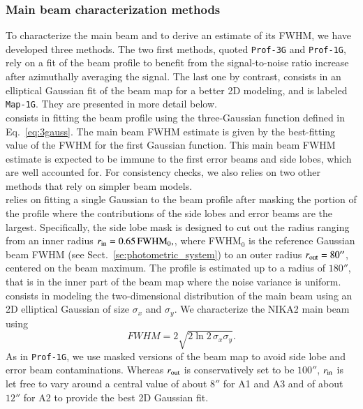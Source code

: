 \subsubsection{Main beam characterization methods}
\label{se:mainbeam_methods}
To characterize the main beam and to derive an estimate of its FWHM, we
have developed three methods. The two first methods, quoted
{\tt Prof-3G} and {\tt Prof-1G}, rely on a fit of the beam profile to
benefit from the signal-to-noise ratio increase after azimuthally
averaging the signal. The last one by contrast,
consists in an elliptical Gaussian fit of the beam map for a better
2D modeling, and is labeled {\tt Map-1G}. They are presented in more
detail below. \\

 consists in fitting the beam profile using the
three-Gaussian function defined in Eq.~\ref{eq:3gauss}.
 The main beam FWHM estimate is given by the best-fitting value
of the FWHM for the first Gaussian function. {\lp This main beam FWHM
estimate is expected to be immune to the first error beams
and side lobes, which are well accounted for. For consistency checks,
we also relies on two other methods that rely on simpler beam models.}\\

 relies on fitting a single Gaussian to the beam
profile after masking the portion of the profile where the
contributions of the side lobes and error beams are the
largest. Specifically, the side lobe mask is designed to cut out {\lp the
radius ranging from an inner radius
$r_{\rm{in}} = 0.65\, \mathrm{FWHM}_0,$, where FWHM$_0$ is the
reference Gaussian beam FWHM (see Sect.~\ref{se:photometric_system})
to an outer radius $r_{\rm{out}} = 80''$,} centered on the beam
maximum.
The profile is estimated up to a radius of
$180''$, that is in the inner part of the beam map where the noise
variance is uniform.\\

 consists in modeling the two-dimensional distribution of
the main beam using an 2D elliptical Gaussian of size $\sigma_x$ and
$\sigma_y$. We characterize the NIKA2 main beam using
\begin{equation}
  FWHM = 2 \sqrt{2\ln {2}\, \sigma_x\sigma_y}.
  \label{eq:fwhm_geom}
\end{equation}
As in {\tt Prof-1G}, we use masked versions of the
beam map to avoid side lobe and error beam contaminations. 
Whereas $r_{\rm{out}}$ is conservatively set to be $100''$,
$r_{\rm{in}}$ is let free to vary around a central value of about $8''$
for A1 and A3 and of about $12''$ for A2 to provide the best 2D Gaussian
fit.

